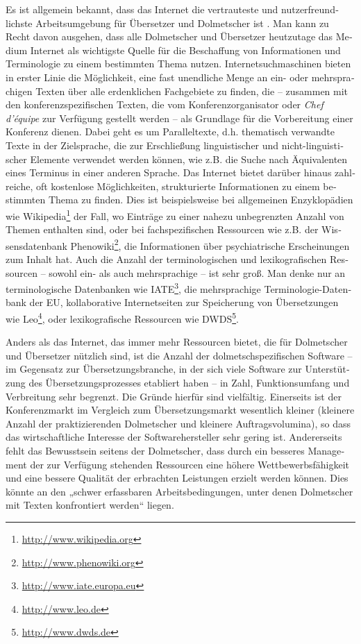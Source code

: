 \documentclass[output=paper]{LSP/langsci}
\begin{document}
\begin{otherlanguage}{ngerman}
Es ist allgemein bekannt, dass das Internet die vertrauteste und nutzerfreundlichste Arbeitsumgebung für Übersetzer und Dolmetscher ist \citep{Zanettin2002}. Man kann zu Recht davon ausgehen, dass alle Dolmetscher und Übersetzer heutzutage das Medium Internet als wichtigste Quelle für die Beschaffung von Informationen und Terminologie zu einem bestimmten Thema nutzen. Internetsuchmaschinen bieten in erster Linie die Möglichkeit, eine fast unendliche Menge an ein- oder mehrsprachigen Texten über alle erdenklichen Fachgebiete zu finden, die -- zusammen mit den konferenzspezifischen Texten, die vom Konferenzorganisator oder \textit{Chef d'équipe} zur Verfügung gestellt werden -- als Grundlage für die Vorbereitung einer Konferenz dienen. Dabei geht es um Paralleltexte, d.h. thematisch verwandte Texte in der Zielsprache, die zur Erschließung linguistischer und nicht-linguistischer Elemente verwendet werden können, wie z.B. die Suche nach Äquivalenten eines Terminus in einer anderen Sprache. Das Internet bietet darüber hinaus zahlreiche, oft kostenlose Möglichkeiten, strukturierte Informationen zu einem bestimmten Thema zu finden. Dies ist beispielsweise bei allgemeinen Enzyklopädien wie Wikipedia\footnote{\url{http://www.wikipedia.org}} der Fall, wo Einträge zu einer nahezu unbegrenzten Anzahl von Themen enthalten sind, oder bei fachspezifischen Ressourcen wie z.B. der Wissensdatenbank Phenowiki\footnote{\url{http://www.phenowiki.org}}, die Informationen über psychiatrische Erscheinungen zum Inhalt hat. Auch die Anzahl der terminologischen und lexikografischen Ressourcen -- sowohl ein- als auch mehrsprachige -- ist sehr groß. Man denke nur an terminologische Datenbanken wie IATE\footnote{\url{http://www.iate.europa.eu}}, die mehrsprachige Terminologie-Datenbank der EU, kollaborative Internetseiten zur Speicherung von Übersetzungen wie Leo\footnote{\url{http://www.leo.de}}, oder lexikografische Ressourcen wie DWDS\footnote{\url{http://www.dwds.de}}.

Anders als das Internet, das immer mehr Ressourcen bietet, die für Dolmetscher und Übersetzer nützlich sind, ist die Anzahl der dolmetschspezifischen Software -- im Gegensatz zur Übersetzungsbranche, in der sich viele Software zur Unterstützung des Übersetzungsprozesses etabliert haben -- in Zahl, Funktionsumfang und Verbreitung sehr begrenzt. Die Gründe hierfür sind vielfältig. Einerseits ist der Konferenzmarkt im Vergleich zum Übersetzungsmarkt wesentlich kleiner (kleinere Anzahl der praktizierenden Dolmetscher und kleinere Auftragsvolumina), so dass das wirtschaftliche Interesse der Softwarehersteller sehr gering ist. Andererseits fehlt das Bewusstsein seitens der Dolmetscher, dass durch ein besseres Management der zur Verfügung stehenden Ressourcen eine höhere Wettbewerbsfähigkeit und eine bessere Qualität der erbrachten Leistungen erzielt werden können. Dies könnte an den „schwer erfassbaren Arbeitsbedingungen, unter denen Dolmetscher mit Texten konfrontiert werden“ \citep[19]{Will2009} liegen.


\end{otherlanguage}
\end{document}

